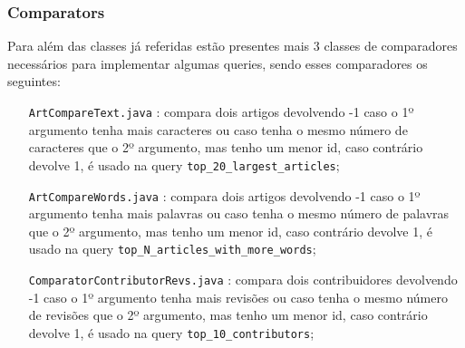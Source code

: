 \documentclass[a4paper,11pt]{article}
\begin{document}
\subsubsection{Comparators}
Para além das classes já referidas estão presentes mais 3 classes de comparadores necessários para implementar algumas queries, sendo esses comparadores os seguintes:
\begin{itemize}[align=left]
\item[\texttt{ArtCompareText.java}]: compara dois artigos devolvendo -1 caso o 1º argumento tenha mais caracteres ou caso tenha o mesmo número de caracteres que o 2º argumento, mas tenho um menor id, caso contrário devolve 1, é usado na query \texttt{top\_20\_largest\_articles};
\item[\texttt{ArtCompareWords.java}]: compara dois artigos devolvendo -1 caso o 1º argumento tenha mais palavras ou caso tenha o mesmo número de palavras que o 2º argumento, mas tenho um menor id, caso contrário devolve 1, é usado na query \texttt{top\_N\_articles\_with\_more\_words};
\item[\texttt{ComparatorContributorRevs.java}]: compara dois contribuidores devolvendo -1 caso o 1º argumento tenha mais revisões ou caso tenha o mesmo número de revisões que o 2º argumento, mas tenho um menor id, caso contrário devolve 1, é usado na query \texttt{top\_10\_contributors};
\end{itemize}
\end{document}
